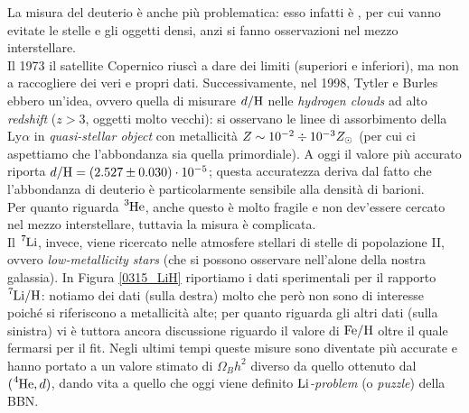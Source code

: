 \noindent La misura del deuterio è anche più problematica: esso infatti è , per cui vanno evitate le stelle e gli oggetti densi, anzi si fanno osservazioni nel mezzo interstellare.\\
Il 1973 il satellite Copernico riuscì a dare dei limiti (superiori e inferiori), ma non a raccogliere dei veri e propri dati. Successivamente, nel 1998, Tytler e Burles ebbero un'idea, ovvero quella di misurare $d/\ce{H}$ nelle \textit{hydrogen clouds} ad alto \textit{redshift} ($z>3$, oggetti molto vecchi): si osservano le linee di assorbimento della Ly$\alpha$ in \textit{quasi-stellar object} con metallicità $Z \sim 10^{-2}\div10^{-3} Z_{\odot}{}$ (per cui ci aspettiamo che l'abbondanza sia quella primordiale). A oggi il valore più accurato riporta $d/\ce{H} = (2.527 \pm 0.030)\cdot\ord{-5}$; questa accuratezza deriva dal fatto che l'abbondanza di deuterio è particolarmente sensibile alla densità di barioni.\\
Per quanto riguarda $\ce{^3He}$, anche questo è molto fragile e non dev'essere cercato nel mezzo interstellare, tuttavia la misura è complicata.\\
Il $\ce{^7Li}$, invece, viene ricercato nelle atmosfere stellari di stelle di popolazione II, ovvero \textit{low-metallicity stars} (che si possono osservare nell'alone della nostra galassia). In Figura \ref{0315_LiH} riportiamo i dati sperimentali per il rapporto $\ce{^7Li}/\ce{H}$: notiamo dei dati (sulla destra) molto  che però non sono di interesse poiché si riferiscono a metallicità alte; per quanto riguarda gli altri dati (sulla sinistra) vi è tuttora ancora discussione riguardo il valore di $\ce{Fe}/\ce{H}$ oltre il quale fermarsi per il fit. Negli ultimi tempi queste misure sono diventate più accurate e hanno portato a un valore stimato di $\Omega_B h^2$ diverso da quello ottenuto dal $(\ce{^4He},d)$, dando vita a quello che oggi viene definito \textit{$\ce{Li}$-problem} (o \textit{puzzle}) della BBN.

